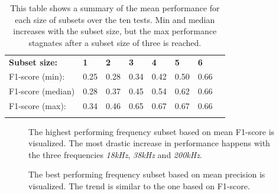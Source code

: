 \begin{longtable}{llllllll}
\caption[Summary exhaustive search]{This table shows a summary of the mean performance for each size of subsets over the ten tests. Min and median increases with the subset size, but the max performance stagnates after a subset size of three is reached. }\\
                  &      &      &      &      &      &      &  \\ \hline
\endfirsthead
%
\endhead
%
\hline
\endfoot
%
\endlastfoot
%
\textbf{Subset size:}      & \textbf{1}    & \textbf{2}    & \textbf{3}    & \textbf{4}    & \textbf{5}    & \textbf{6}    &  \\ \hline
F1-score (min):   & 0.25 & 0.28 & 0.34 & 0.42 & 0.50 & 0.66 &  \\
F1-score (median) & 0.28 & 0.37 & 0.45 & 0.54 & 0.62 & 0.66 &  \\
F1-score (max):   & 0.34 & 0.46 & 0.65 & 0.67 & 0.67 & 0.66 &  \\ \hline
\label{summary_per_subset_size_table}

\end{longtable}
    
        
        \begin{figure}[H]
            \centering
            
            \caption[Best frequency combination - F1-score]{The highest performing frequency subset based on mean F1-score is visualized. The most drastic increase in performance happens with the three frequencies \textit{18kHz}, \textit{38kHz} and \textit{200kHz}.}
          	\medskip 
            \label{increasing_freq_f1_score_fig}
        \end{figure}

        \clearpage
        \begin{figure}[H]
            \centering
            
            \caption[Best frequency combination - Precision]{The best performing frequency subset based on mean precision is visualized. The trend is similar to the one based on F1-score.}
          	\medskip 
            \label{increasing_freq_precision_score_fig}
        \end{figure}
        

